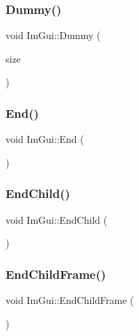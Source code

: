 \hypertarget{namespace_im_gui_a8b0fb07113251301ff897b8578a53f34}{}\label{namespace_im_gui_a8b0fb07113251301ff897b8578a53f34} 
\subsubsection{\texorpdfstring{Dummy()}{Dummy()}}
{\footnotesize\ttfamily void Im\+Gui\+::\+Dummy (\begin{DoxyParamCaption}\item[{const \hyperlink{struct_im_vec2}{Im\+Vec2} \&}]{size }\end{DoxyParamCaption})}

\hypertarget{namespace_im_gui_a5479d93794a004c67ceb6d13f37c8254}{}\label{namespace_im_gui_a5479d93794a004c67ceb6d13f37c8254} 
\subsubsection{\texorpdfstring{End()}{End()}}
{\footnotesize\ttfamily void Im\+Gui\+::\+End (\begin{DoxyParamCaption}{ }\end{DoxyParamCaption})}

\hypertarget{namespace_im_gui_af8de559a88c1442d6df8c1b04c86e997}{}\label{namespace_im_gui_af8de559a88c1442d6df8c1b04c86e997} 
\subsubsection{\texorpdfstring{End\+Child()}{EndChild()}}
{\footnotesize\ttfamily void Im\+Gui\+::\+End\+Child (\begin{DoxyParamCaption}{ }\end{DoxyParamCaption})}

\hypertarget{namespace_im_gui_ac4bd9024554b5074805bc0ce3076c514}{}\label{namespace_im_gui_ac4bd9024554b5074805bc0ce3076c514} 
\subsubsection{\texorpdfstring{End\+Child\+Frame()}{EndChildFrame()}}
{\footnotesize\ttfamily void Im\+Gui\+::\+End\+Child\+Frame (\begin{DoxyParamCaption}{ }\end{DoxyParamCaption})}

